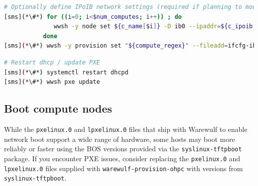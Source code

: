 \documentclass[letterpaper]{article}
\begin{document}
\begin{lstlisting}[language=bash,keywords={},upquote=true,basicstyle=\footnotesize\ttfamily]
# Optionally define IPoIB network settings (required if planning to mount Lustre over IB)
[sms](*\#*) for ((i=0; i<$num_computes; i++)) ; do
              wwsh -y node set ${c_name[$i]} -D ib0 --ipaddr=${c_ipoib[$i]} --netmask=${ipoib_netmask}
           done
[sms](*\#*) wwsh -y provision set "${compute_regex}" --fileadd=ifcfg-ib0.ww
\end{lstlisting}



\begin{lstlisting}[language=bash,keywords={},upquote=true,basicstyle=\footnotesize\ttfamily]
# Restart dhcp / update PXE
[sms](*\#*) systemctl restart dhcpd
[sms](*\#*) wwsh pxe update
\end{lstlisting}


\subsection{Boot compute nodes} \label{sec:boot_computes}
 


\begin{center}
\begin{tcolorbox}[]
\small While the \texttt{pxelinux.0} and \texttt{lpxelinux.0} files that ship
with Warewulf to enable network boot support a wide range of hardware, some
hosts may boot more reliably or faster using the BOS versions provided via the
\texttt{syslinux-tftpboot} package. If you encounter PXE issues, consider
replacing the \texttt{pxelinux.0} and \texttt{lpxelinux.0} files supplied with
\texttt{warewulf-provision-ohpc} with versions from \texttt{syslinux-tftpboot}.
\end{tcolorbox}
\end{center}
\end{document}
